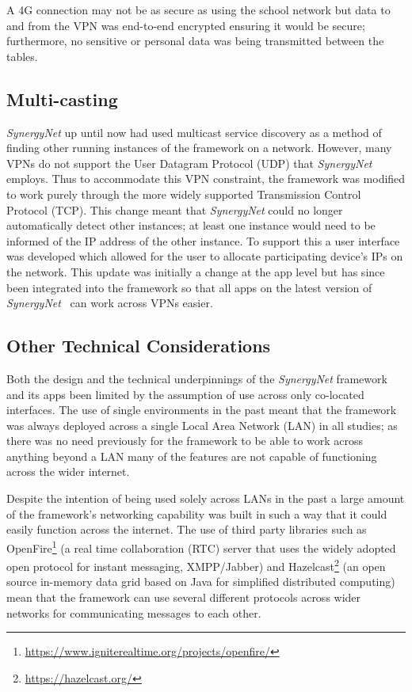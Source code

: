 \documentclass[a4paper,11pt]{article}
\begin{document}
A 4G connection may not be as secure as using the school network but data to and from the VPN was end-to-end encrypted ensuring it would be secure; furthermore, no sensitive or personal data was being transmitted between the tables.

\subsection{Multi-casting}

{\emph{SynergyNet}} up until now had used multicast service discovery as a method of finding other running instances of the framework on a network.
However, many VPNs do not support the User Datagram Protocol (UDP) that {\emph{SynergyNet}} employs.
Thus to accommodate this VPN constraint, the framework was modified to work purely through the more widely supported Transmission Control Protocol (TCP).
This change meant that {\emph{SynergyNet}} could no longer automatically detect other instances; at least one instance would need to be informed of the IP address of the other instance.
To support this a user interface was developed which allowed for the user to allocate participating device's IPs on the network.
This update was initially a change at the app level but has since been integrated into the framework so that all apps on the latest version of {\emph{SynergyNet}}~\cite{hatch:2011} can work across VPNs easier.

\subsection{Other Technical Considerations}

Both the design and the technical underpinnings of the {\emph{SynergyNet}} framework and its apps been limited by the assumption of use across only co-located interfaces.
The use of single environments in the past meant that the framework was always deployed across a single Local Area Network (LAN) in all studies; as there was no need previously for the framework to be able to work across anything beyond a LAN many of the features are not capable of functioning across the wider internet.

Despite the intention of being used solely across LANs in the past a large amount of the framework's networking capability was built in such a way that it could easily function across the internet.
The use of third party libraries such as OpenFire\footnote{\url{https://www.igniterealtime.org/projects/openfire/}} (a real time collaboration (RTC) server that uses the widely adopted open protocol for instant messaging, XMPP/Jabber) and Hazelcast\footnote{\url{https://hazelcast.org/}} (an open source in-memory data grid based on Java for simplified distributed computing) mean that the framework can use several different protocols across wider networks for communicating messages to each other.
\end{document}
